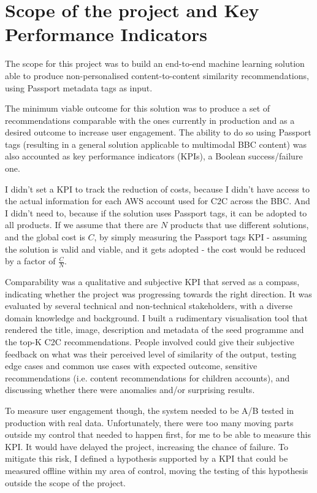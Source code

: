 
\section{Scope of the project and Key Performance Indicators}

The scope for this project was to build an end-to-end machine learning solution able to produce non-personalised content-to-content
similarity recommendations, using Passport metadata tags as input.

The minimum viable outcome for this solution was to produce a set of recommendations comparable with the ones currently in production and
as a desired outcome to increase user engagement. The ability to do so using Passport tags (resulting in a general solution applicable to multimodal
BBC content) was also accounted as key performance indicators (KPIs), a Boolean success/failure one.

I didn't set a KPI to track the reduction of costs, because I didn't have access to the actual information for each AWS account used for C2C across
the BBC. And I didn't need to, because if the solution uses Passport tags, it can be adopted to all products.
If we assume that there are $N$ products that use different solutions, and the global cost is $C$, by simply measuring the Passport tags KPI -
assuming the solution is valid and viable, and it gets adopted - the cost would be reduced by a factor of $\frac{C}{N}$.

Comparability was a qualitative and subjective KPI that served as a compass, indicating whether the project was progressing towards the right direction.
It was evaluated by several technical and non-technical stakeholders, with a diverse domain knowledge and background. I built a rudimentary visualisation
tool that rendered the title, image, description and metadata of the seed programme and the top-K C2C recommendations.
People involved could give their subjective feedback on what was their perceived level of similarity of the output,
testing edge cases and common use cases with expected outcome, sensitive recommendations (i.e. content recommendations for children accounts),
and discussing whether there were anomalies and/or surprising results.

To measure user engagement though, the system needed to be A/B tested in production with real data.
Unfortunately, there were too many moving parts outside my control that needed to happen first, for me to be able to measure this KPI.
It would have delayed the project, increasing the chance of failure.
To mitigate this risk, I defined a hypothesis supported by a KPI that could be measured offline within my area of control, moving the
testing of this hypothesis outside the scope of the project.

